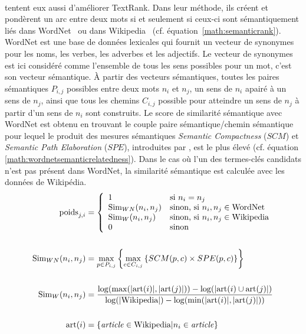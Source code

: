         ~\\ tentent eux aussi d'améliorer
        TextRank. Dans leur méthode, ils créent et pondèrent un arc entre deux
        mots si et seulement si ceux-ci sont sémantiquement liés dans
        WordNet~\cite{miller1995wordnet} ou dans
        Wikipedia~\cite{milne2008wikipediasemanticrelatedness} (cf.
        équation~\ref{math:semanticrank}). WordNet est une base de données
        lexicales qui fournit un vecteur de synonymes pour les noms, les verbes,
        les adverbes et les adjectifs. Le vecteur de synonymes est ici considéré
        comme l'ensemble de tous les sens possibles pour un mot, c'est son
        vecteur sémantique. À partir des vecteurs sémantiques, toutes les paires
        sémantiques $P_{i, j}$ possibles entre deux mots $n_i$ et $n_j$, un sens
        de $n_i$ apairé à un sens de $n_j$, ainsi que tous les chemins $C_{i,
        j}$ possible pour atteindre un sens de $n_j$ à partir d'un sens de $n_i$
        sont construits. Le score de similarité sémantique avec WordNet est
        obtenu en trouvant le couple paire sémantique/chemin sémantique pour
        lequel le produit des mesures sémantiques \textit{Semantic Compactness}
        ($SCM$) et \textit{Semantic Path Elaboration} ($SPE$), introduites par
        , est le plus élevé (cf.
        équation \ref{math:wordnetsemanticrelatedness}). Dans le cas où l'un des
        termes-clés candidats n'est pas présent dans WordNet, la similarité
        sémantique est calculée avec les données de Wikipédia.
        \begin{align}
          \text{poids}_{j, i} &= \left\{\begin{array}{ll}
            1 & \text{si $n_i = n_j$}\\
            \text{Sim}_{WN}(n_i, n_j) & \text{sinon, si $n_i, n_j \in \text{WordNet}$}\\
             \text{Sim}_{W}(n_i, n_j) &  \text{sinon, si $n_i, n_j \in \text{Wikipedia}$}\\
            0 & \text{sinon}
          \end{array}\right. \label{math:semanticrank}\\
          \notag\\
          \text{Sim}_{WN}(n_i, n_j) &= \max_{p \in P_{i, j}}\left\{\max_{c \in C_{i, j}}\left\{SCM(p, c) \times SPE(p, c)\right\}\right\} \label{math:wordnetsemanticrelatedness}\\
          \notag\\
          \text{Sim}_{W}(n_i, n_j) &= \frac{\log(\max(|\text{art}(i)|, |\text{art}(j)|)) - \log(|\text{art}(i) \cup \text{art}(j)|)}{\log(|\text{Wikipedia}|) - \log(\min(|\text{art}(i)|, |\text{art}(j)|))} \label{math:wikipediasemanticrelatedness}\\
          \notag\\
          \text{art}(i) &= \left\{\text{\textit{article}} \in \text{Wikipedia} | n_i \in \text{\textit{article}}\right\} \notag
        \end{align}

